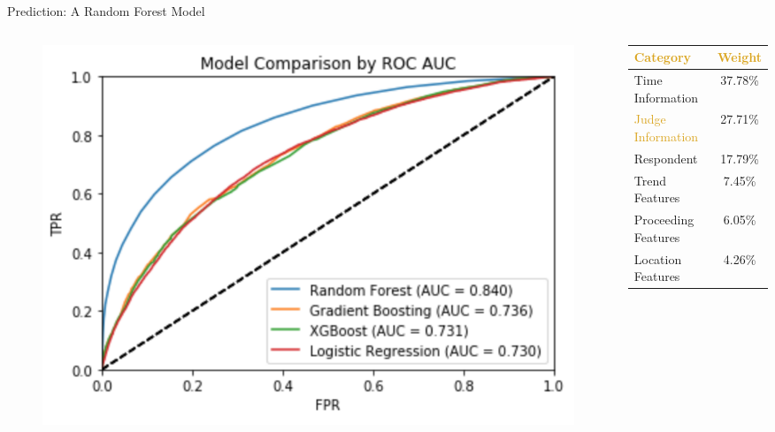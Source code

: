 \begin{frame}{Prediction: A Random Forest Model}
    \begin{columns}[T]
    \begin{column}{0.6\textwidth}

        \begin{figure}
            \centering
            \includegraphics[height = 0.65 \textheight]{images/model_selection3.png}
            \end{figure}
    \end{column}
        
    \begin{column}{0.35\textwidth}
        \begin{table}[h!]
            \small
            \begin{center}
              \begin{tabular}{lc}
                
                \textcolor{goldenrod}{\textbf{Category}} & \textcolor{goldenrod}{\textbf{Weight}}  \\
                \hline
                Time Information & 37.78\%\\
                \textcolor{goldenrod}{Judge Information} & 27.71\%\\
                Respondent & 17.79\%\\
                Trend Features & 7.45\%\\
                Proceeding Features & 6.05\%\\
                Location Features & 4.26\%
              \end{tabular}
            \end{center}
          \end{table}
    \end{column}
        
    \end{columns}
    
\end{frame}

